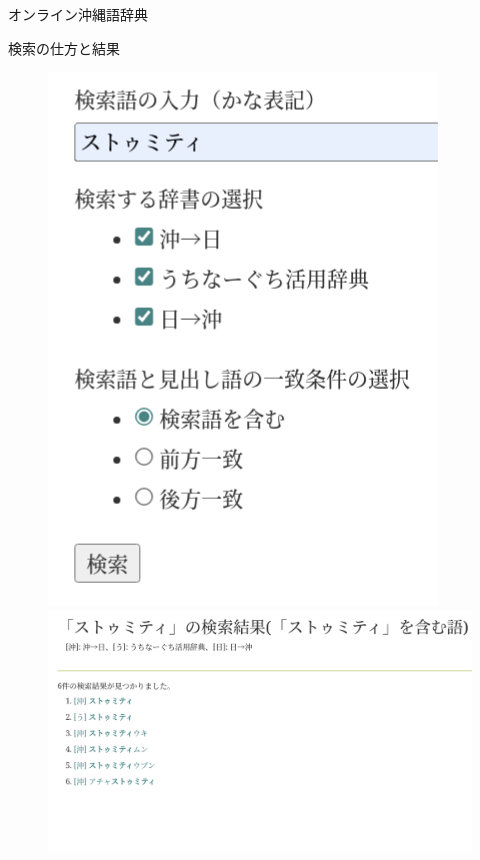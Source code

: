 \documentclass[14pt]{beamer}
\begin{document}
\begin{frame}{オンライン沖縄語辞典}
  \begin{block}{検索の仕方と結果}
    \begin{figure}[ht]
      \centering
      \begin{minipage}{0.4\paperwidth}
        \includegraphics[width=0.3\paperwidth]{okinawago-app-how-to-search.png}
      \end{minipage}%
      \begin{minipage}{0.7\paperwidth}
        \includegraphics[width=0.5\paperwidth]{okinawago-app-search-result.png}
      \end{minipage}
    \end{figure}
    
  \end{block}
\end{frame}
\end{document}
